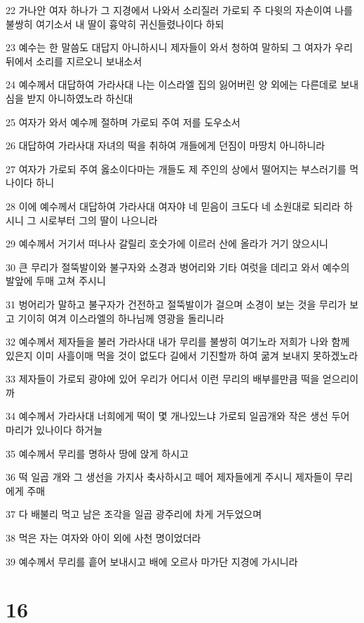 \par 22 가나안 여자 하나가 그 지경에서 나와서 소리질러 가로되 주 다윗의 자손이여 나를 불쌍히 여기소서 내 딸이 흉악히 귀신들렸나이다 하되
\par 23 예수는 한 말씀도 대답지 아니하시니 제자들이 와서 청하여 말하되 그 여자가 우리 뒤에서 소리를 지르오니 보내소서
\par 24 예수께서 대답하여 가라사대 나는 이스라엘 집의 잃어버린 양 외에는 다른데로 보내심을 받지 아니하였노라 하신대
\par 25 여자가 와서 예수께 절하며 가로되 주여 저를 도우소서
\par 26 대답하여 가라사대 자녀의 떡을 취하여 개들에게 던짐이 마땅치 아니하니라
\par 27 여자가 가로되 주여 옳소이다마는 개들도 제 주인의 상에서 떨어지는 부스러기를 먹나이다 하니
\par 28 이에 예수께서 대답하여 가라사대 여자야 네 믿음이 크도다 네 소원대로 되리라 하시니 그 시로부터 그의 딸이 나으니라
\par 29 예수께서 거기서 떠나사 갈릴리 호숫가에 이르러 산에 올라가 거기 앉으시니
\par 30 큰 무리가 절뚝발이와 불구자와 소경과 벙어리와 기타 여럿을 데리고 와서 예수의 발앞에 두매 고쳐 주시니
\par 31 벙어리가 말하고 불구자가 건전하고 절뚝발이가 걸으며 소경이 보는 것을 무리가 보고 기이히 여겨 이스라엘의 하나님께 영광을 돌리니라
\par 32 예수께서 제자들을 불러 가라사대 내가 무리를 불쌍히 여기노라 저희가 나와 함께 있은지 이미 사흘이매 먹을 것이 없도다 길에서 기진할까 하여 굶겨 보내지 못하겠노라
\par 33 제자들이 가로되 광야에 있어 우리가 어디서 이런 무리의 배부를만큼 떡을 얻으리이까
\par 34 예수께서 가라사대 너희에게 떡이 몇 개나있느냐 가로되 일곱개와 작은 생선 두어 마리가 있나이다 하거늘
\par 35 예수께서 무리를 명하사 땅에 앉게 하시고
\par 36 떡 일곱 개와 그 생선을 가지사 축사하시고 떼어 제자들에게 주시니 제자들이 무리에게 주매
\par 37 다 배불리 먹고 남은 조각을 일곱 광주리에 차게 거두었으며
\par 38 먹은 자는 여자와 아이 외에 사천 명이었더라
\par 39 예수께서 무리를 흩어 보내시고 배에 오르사 마가단 지경에 가시니라

\chapter{16}

